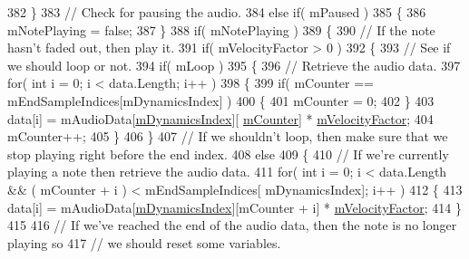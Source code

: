 \begin{DoxyCodeInclude}
382             \}
383             \textcolor{comment}{// Check for pausing the audio.}
384             \textcolor{keywordflow}{else} \textcolor{keywordflow}{if}( mPaused )
385             \{
386                 mNotePlaying = \textcolor{keyword}{false};
387             \}
388             \textcolor{keywordflow}{if}( mNotePlaying )
389             \{
390                 \textcolor{comment}{// If the note hasn't faded out, then play it.}
391                 \textcolor{keywordflow}{if}( mVelocityFactor > 0 )
392                 \{
393                     \textcolor{comment}{// See if we should loop or not.}
394                     \textcolor{keywordflow}{if}( mLoop )
395                     \{
396                         \textcolor{comment}{// Retrieve the audio data.}
397                         \textcolor{keywordflow}{for}( \textcolor{keywordtype}{int} i = 0; i < data.Length; i++ )
398                         \{
399                             \textcolor{keywordflow}{if}( mCounter == mEndSampleIndices[mDynamicsIndex] )
400                             \{
401                                 mCounter = 0;
402                             \}
403                             data[i] = mAudioData[\hyperlink{group___n_o_o_priv_var_gaf0c9c2a90b5d73b8ffa0906bc69acdbc}{mDynamicsIndex}][
      \hyperlink{group___n_o_o_priv_var_ga5dca97be8d58837ace4ea6f4a972b20a}{mCounter}] * \hyperlink{group___n_o_o_priv_var_ga84df25e871d69746a7c520f3f8b49a27}{mVelocityFactor};
404                             mCounter++;
405                         \}
406                     \}
407                     \textcolor{comment}{// If we shouldn't loop, then make sure that we stop playing right before the end
       index.}
408                     \textcolor{keywordflow}{else}
409                     \{
410                         \textcolor{comment}{// If we're currently playing a note then retrieve the audio data. }
411                         \textcolor{keywordflow}{for}( \textcolor{keywordtype}{int} i = 0; i < data.Length && ( mCounter + i ) < mEndSampleIndices[
      mDynamicsIndex]; i++ )
412                         \{
413                             data[i] = mAudioData[\hyperlink{group___n_o_o_priv_var_gaf0c9c2a90b5d73b8ffa0906bc69acdbc}{mDynamicsIndex}][mCounter + i] * 
      \hyperlink{group___n_o_o_priv_var_ga84df25e871d69746a7c520f3f8b49a27}{mVelocityFactor};
414                         \}
415 
416                         \textcolor{comment}{// If we've reached the end of the audio data, then the note is no longer playing
       so}
417                         \textcolor{comment}{// we should reset some variables.}

\end{DoxyCodeInclude}
